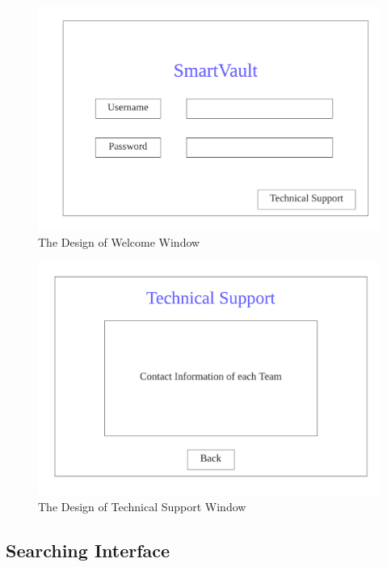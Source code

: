 \documentclass[12pt, titlepage]{article}
\begin{document}
\begin{figure}[H]
    \centering
    \includegraphics[scale=0.8]{Welcome.png}
    \caption{The Design of Welcome Window}
\end{figure}

\begin{figure}[H]
    \centering
    \includegraphics[scale=0.8]{Technical.png}
    \caption{The Design of Technical Support Window}
\end{figure}

\subsection{Searching Interface}
\end{document}

